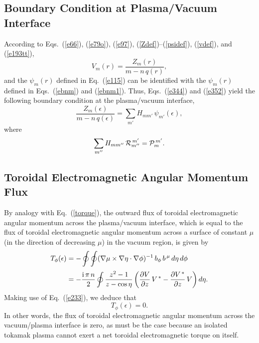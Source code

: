 \documentclass[12pt,prb,aps]{revtex4-1}
\begin{document}
\subsection{Boundary Condition at Plasma/Vacuum Interface}
According to Eqs.~(\ref{e66}), (\ref{e79o}), (\ref{e97}), (\ref{Zdef})--(\ref{psidef}),  (\ref{vdef}), and (\ref{e193tt}), 
\begin{equation}\label{evdef}
V_m(r)= \frac{Z_m(r)}{m-n\,q(r)},
\end{equation}
and the $\psi_m(r)$ defined in Eq.~(\ref{e115}) can be identified with the $\psi_m(r)$ defined in Eqs.~(\ref{ebnm}) and (\ref{ebnm1}). 
Thus, Eqs.~(\ref{e344}) and (\ref{e352}) yield the following boundary condition at the plasma/vacuum interface,
\begin{equation}\label{bc}
\frac{Z_m(\epsilon)}{m-n\,q(\epsilon)} = \sum_{m'} H_{mm'}\,\psi_{m'}(\epsilon),
\end{equation}
where
\begin{equation}\label{ehdef}
\sum_{m''}H_{mm''}\,{\cal R}_{m''}^{\,m'} = {\cal P}_m^{\,m'}.
\end{equation}

\subsection{Toroidal Electromagnetic Angular Momentum Flux}
By analogy with Eq.~(\ref{torque}), the outward flux of toroidal electromagnetic angular momentum across the plasma/vacuum interface,
which is equal to the flux of  toroidal electromagnetic angular momentum across a surface of constant $\mu$ (in the direction of
decreasing $\mu$) in the vacuum region, is given by 
\begin{align}
T_\phi(\epsilon) &= -\oint\oint (\nabla\mu\times \nabla\eta\cdot\nabla\phi)^{-1}\,b_\phi\,b^{\,\mu}\,d\eta\,d\phi\nonumber\\[0.5ex]
&= -\frac{{\rm i}\,\pi\,n}{2}\oint \frac{z^2-1}{z-\cos\eta}\left(\frac{\partial V}{\partial z}\,V^{\,\ast}-\frac{\partial V^{\,\ast}}{\partial z}\,V\right)d\eta.
\end{align}
Making use of Eq.~(\ref{e233}), we deduce that 
\begin{equation}\label{e300}
T_\phi(\epsilon)=0.
\end{equation}
In other words, the flux of toroidal  electromagnetic angular momentum across the vacuum/plasma interface is zero, as must be the
case because an isolated tokamak plasma cannot exert a net toroidal electromagnetic torque on itself.\cite{am1}
\end{document}
